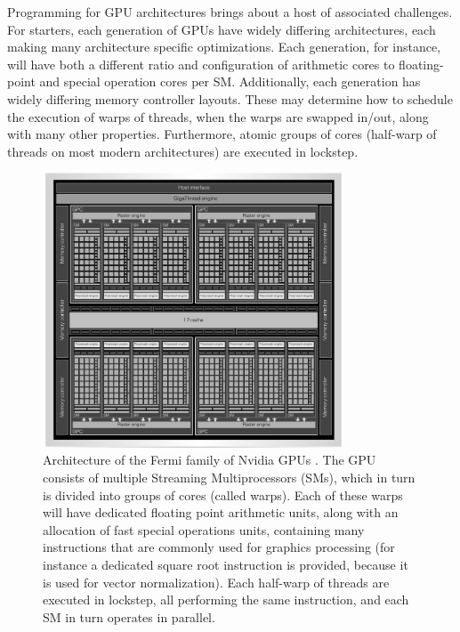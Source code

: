 Programming for GPU architectures brings about a host of associated challenges. For starters, each generation of GPUs have widely differing architectures, each making many architecture specific optimizations. Each generation, for instance, 
will have both a different ratio and configuration of arithmetic cores to floating-point and special operation cores per SM. Additionally, each generation has widely differing memory controller layouts. These may determine how to schedule 
the execution of warps of threads, when the warps are swapped in/out, along with many other properties. Furthermore, atomic groups of cores (half-warp of threads on most modern
architectures) are executed in lockstep. 
\begin{figure}[h!]
\begin{mdframed}
 \centering
 \includegraphics[width=0.8\textwidth]{fermi_arch.png}
 \caption[Architecture of the Fermi family of Nvidia GPUs]{Architecture of the Fermi family of Nvidia GPUs \cite{wittenbrink2011fermi}. The GPU consists of multiple Streaming Multiprocessors (SMs), which in turn is divided into groups
 of cores (called warps). Each of these warps will have dedicated floating point arithmetic units, along with an allocation of fast special operations units, containing many instructions that
 are commonly used for graphics processing (for instance a dedicated square root instruction is provided, because it is used for vector normalization). Each half-warp of threads
 are executed in lockstep, all performing the same instruction, and each SM in turn operates in parallel.}
 \label{FERMI_ARCH}
\end{mdframed}
\end{figure}

